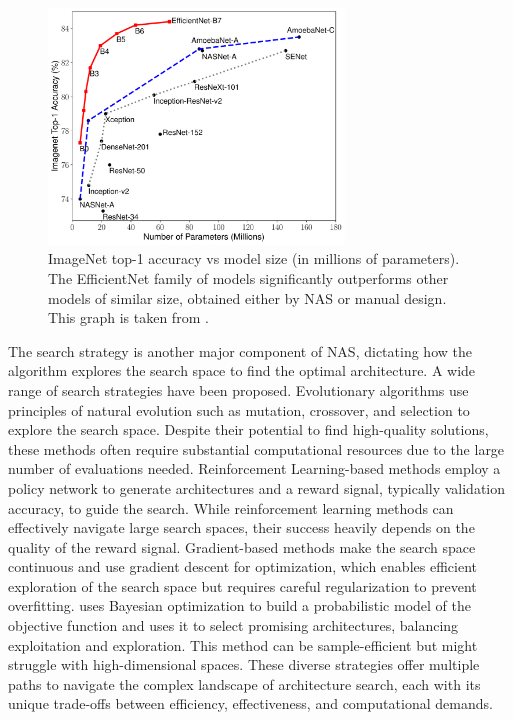 \begin{figure}[htbp]
    \centering
    \includegraphics[width=0.70\textwidth]{chapter_sota/assets/efficientnet_perfs_overview.pdf}   
    \caption{ImageNet top-1 accuracy vs model size (in millions of parameters).
    The EfficientNet family of models significantly outperforms other models of
    similar size, obtained either by \ac{NAS} or manual design. This graph is
    taken from \cite{DBLP:conf/icml/TanL19}.
    }
    \label{fig:sota:efficientnet_perfs}
\end{figure}


The search strategy is another major component of \ac{NAS}, dictating how the
algorithm explores the search space to find the optimal architecture. A wide
range of search strategies have been proposed. Evolutionary algorithms
\cite{DBLP:conf/icml/RealMSSSTLK17} use principles of natural evolution such as
mutation, crossover, and selection to explore the search space. Despite their
potential to find high-quality solutions, these methods often require
substantial computational resources due to the large number of evaluations
needed. Reinforcement Learning-based methods \cite{DBLP:conf/iclr/ZophL17}
employ a policy network to generate architectures and a reward signal, typically
validation accuracy, to guide the search. While reinforcement learning methods
can effectively navigate large search spaces, their success heavily depends on
the quality of the reward signal. Gradient-based methods
\cite{DBLP:conf/iclr/LiuSY19,DBLP:conf/iclr/XuX0CQ0X20} make the search space
continuous and use gradient descent for optimization, which enables efficient
exploration of the search space but requires careful regularization to prevent
overfitting. \cite{DBLP:conf/nips/BergstraBBK11} uses Bayesian optimization to
build a probabilistic model of the objective function and uses it to select
promising architectures, balancing exploitation and exploration. This method can
be sample-efficient but might struggle with high-dimensional spaces. These
diverse strategies offer multiple paths to navigate the complex landscape of
architecture search, each with its unique trade-offs between efficiency,
effectiveness, and computational demands.\\


